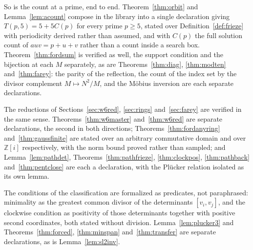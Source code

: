 \documentclass[11pt]{article}
\theoremstyle{plain}
\theoremstyle{definition}
\newcommand{\Z}{\mathbb{Z}}
\begin{document}
So is the count at a prime, end to end. Theorem~\ref{thm:orbit} and Lemma~\ref{lem:acount}
compose in the library into a single declaration giving $T(p,5)=5+5C(p)$ for every prime
$p\ge5$, stated over Definition~\ref{def:frieze} with periodicity derived rather than
assumed, and with $C(p)$ the full solution count of $auv=p+u+v$ rather than a count inside a
search box. Theorem~\ref{thm:fordsum} is verified as well, the support condition and the
bijection at each $M$ separately, as are Theorems~\ref{thm:diag}, \ref{thm:modten}
and~\ref{thm:farey}: the parity of the reflection, the count of the index set by the
divisor complement $M\mapsto N^2/M$, and the Möbius inversion are each separate
declarations.

The reductions of Sections~\ref{sec:w6red}, \ref{sec:rings} and~\ref{sec:farey} are
verified in the same sense. Theorems~\ref{thm:w6master} and~\ref{thm:w6red} are separate
declarations, the second in both directions; Theorems~\ref{thm:fordanyring}
and~\ref{thm:gaussfinite} are stated over an arbitrary commutative domain and over $\Z[i]$
respectively, with the norm bound proved rather than sampled; and
Lemma~\ref{lem:pathdet}, Theorems~\ref{thm:pathfrieze}, \ref{thm:clockpos},
\ref{thm:pathback} and~\ref{thm:pentclose} are each a declaration, with the Pl\"ucker
relation isolated as its own lemma.

The conditions of the classification are formalized as predicates, not paraphrased:
minimality as the greatest common divisor of the determinants $[v_i,v_j]$, and the clockwise
condition as positivity of those determinants together with positive second coordinates,
both stated without division. Lemma~\ref{lem:plucker3} and
Theorems~\ref{thm:forced}, \ref{thm:minspan} and~\ref{thm:transfer} are separate
declarations, as is Lemma~\ref{lem:sl2inv}.
\end{document}
